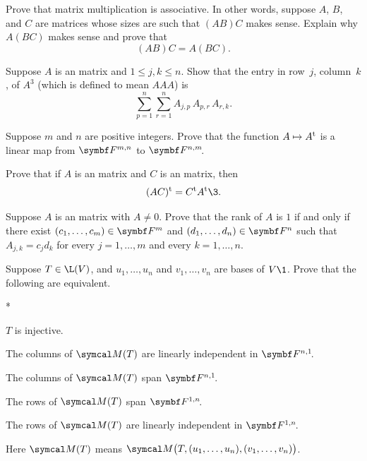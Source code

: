 \begin{exercises}
\exercise
Prove that matrix multiplication is associative.  In other words, suppose $A$,
$B$, and $C$ are matrices whose sizes are such that $(AB)C$ makes sense.
Explain why $A(BC)$ makes sense and prove that\label{assoc} \[(AB)C = A(BC).\]


\exercise
Suppose $A$ is an  matrix and $1 \le j, k \le n$. Show that the entry in row~$j$, column~$k$, of $A^3$ (which is defined to mean $AAA$) is
\[
\sum_{p=1}^n \sum_{r=1}^n A_{j, p} \, A_{p, r} \, A_{r, k}.
\]
\vspace{-10bp}


\exercise
Suppose $m$ and $n$ are positive integers. Prove that the function $A \mapsto A^{\text{t}}$ is a linear map from $\F{m, n}$ to
$\FF{n, m}$.\label{3translinear}


\pagebreak[3]

\exercise
Prove that if $A$ is an  matrix and $C$ is an  matrix, then\label{3tran}
\[
\tran{(AC)} = \tran{C} \tran{A}\3.
\]
\exercisedisplayend
{}


\pagebreak[3]

\exercise
Suppose $A$ is an  matrix with $A \ne 0$. Prove that the rank of $A$ is $1$ if and only if there exist $(c_1, \dots, c_m) \in \F{m}$ and $(d_1, \dots, d_n)\in \F{n}$ such that $A_{j,k} = c_j d_k$ for every $j = 1, \dots, m$ and every $k = 1, \dots, n$.


\exercise
Suppose $T \in \L(V)$, and $u_1, \dots, u_n$ and $v_1, \dots, v_n$ are bases of $V\1$. Prove that the following are equivalent.
\begin{subtheorem}*
\item
$T$ is injective.
\item
The columns of $\M(T)$ are linearly independent in $\FF{n,1}$.
\item
The columns of $\M(T)$ span $\FF{n,1}$.
\item
The rows of $\M(T)$ span $\FF{1,n}$.
\item
The rows of $\M(T)$ are linearly independent in $\FF{1,n}$.
\end{subtheorem}
Here $\M(T)$ means $\M\bigl( T, (u_1, \dots, u_n), (v_1, \dots, v_n) \bigr)$.


\end{exercises}

